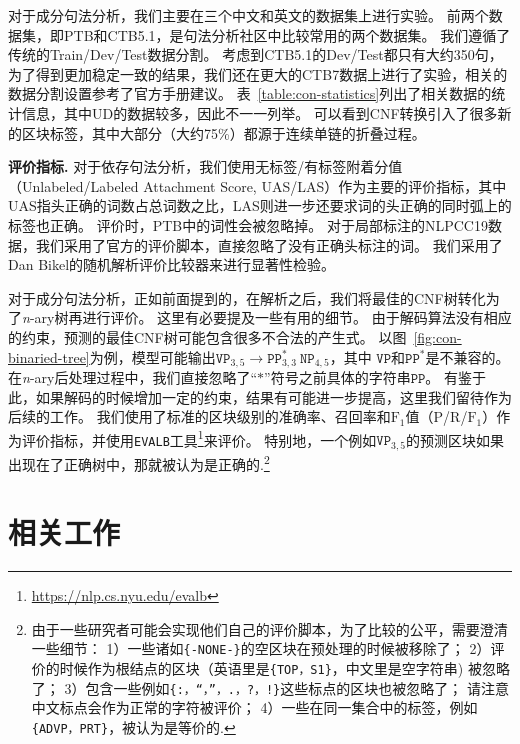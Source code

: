 对于成分句法分析，我们主要在三个中文和英文的数据集上进行实验。
前两个数据集，即PTB和CTB5.1，是句法分析社区中比较常用的两个数据集。
我们遵循了传统的Train/Dev/Test数据分割。
考虑到CTB5.1的Dev/Test都只有大约350句，为了得到更加稳定一致的结果，我们还在更大的CTB7数据上进行了实验，相关的数据分割设置参考了官方手册建议。
表~\ref{table:con-statistics}列出了相关数据的统计信息，其中UD的数据较多，因此不一一列举。
可以看到CNF转换引入了很多新的区块标签，其中大部分（大约75\%）都源于连续单链的折叠过程。



\noindent\textbf{评价指标.}
对于依存句法分析，我们使用无标签/有标签附着分值（Unlabeled/Labeled Attachment Score, UAS/LAS）作为主要的评价指标，其中UAS指头正确的词数占总词数之比，LAS则进一步还要求词的头正确的同时弧上的标签也正确。
评价时，PTB中的词性会被忽略掉。
对于局部标注的NLPCC19数据，我们采用了官方的评价脚本，直接忽略了没有正确头标注的词。
我们采用了Dan Bikel的随机解析评价比较器来进行显著性检验。

对于成分句法分析，正如前面提到的，在解析之后，我们将最佳的CNF树转化为了\textit{n}-ary树再进行评价。
这里有必要提及一些有用的细节。
由于解码算法没有相应的约束，预测的最佳CNF树可能包含很多不合法的产生式。
以图~\ref{fig:con-binaried-tree}为例，模型可能输出$\texttt{VP}_{3,5} \rightarrow \texttt{PP}^{\ast}_{3,3} ~ \texttt{NP}_{4,5}$，其中 $\texttt{VP}$和$\texttt{PP}^{\ast}$是不兼容的。
在\textit{n}-ary后处理过程中，我们直接忽略了``$\mathtt{\ast}$''符号之前具体的字符串$\texttt{PP}$。
有鉴于此，如果解码的时候增加一定的约束，结果有可能进一步提高，这里我们留待作为后续的工作。
我们使用了标准的区块级别的准确率、召回率和$\mathrm{F}_1$值（$\mathrm{P}$/$\mathrm{R}$/$\mathrm{F}_1$）作为评价指标，并使用\texttt{EVALB}工具\footnote{\url{https://nlp.cs.nyu.edu/evalb}}来评价。
特别地，一个例如$\texttt{VP}_{3,5}$的预测区块如果出现在了正确树中，那就被认为是正确的.\footnote{
	由于一些研究者可能会实现他们自己的评价脚本，为了比较的公平，需要澄清一些细节：
	1）一些诸如\texttt{\{-NONE-\}}的空区块在预处理的时候被移除了；
	2）评价的时候作为根结点的区块（英语里是\texttt{\{TOP，S1\}}，中文里是空字符串) 被忽略了；
	3）包含一些例如\texttt{\{:，``，''，.，?，!\}}这些标点的区块也被忽略了；
	请注意中文标点会作为正常的字符被评价；
	4）一些在同一集合中的标签，例如\texttt{\{ADVP，PRT\}}，被认为是等价的.}

\section{相关工作}
\label{sec:relworks}

